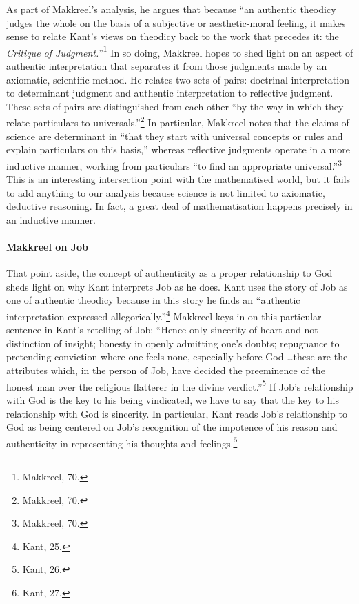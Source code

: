 \documentclass[12pt]{article}
\begin{document}
	As part of Makkreel's analysis, he argues that because ``an authentic theodicy judges the whole on the basis of a subjective or aesthetic-moral feeling, it makes sense to relate Kant's views on theodicy back to the work that precedes it: the \emph{Critique of Judgment.}''\footnote{Makkreel, 70.} In so doing, Makkreel hopes to shed light on an aspect of authentic interpretation that separates it from those judgments made by an axiomatic, scientific method. He relates two sets of pairs: doctrinal interpretation to determinant judgment and authentic interpretation to reflective judgment. These sets of pairs are distinguished from each other ``by the way in which they relate particulars to universals.''\footnote{Makkreel, 70.} In particular, Makkreel notes that the claims of science are determinant in ``that they start with universal concepts or rules and explain particulars on this basis,'' whereas reflective judgments operate in a more inductive manner, working from particulars ``to find an appropriate universal.''\footnote{Makkreel, 70.} This is an interesting intersection point with the mathematised world, but it fails to add anything to our analysis because science is not limited to axiomatic, deductive reasoning. In fact, a great deal of mathematisation happens precisely in an inductive manner. 
	
	\paragraph*{Makkreel on Job} That point aside, the concept of authenticity as a proper relationship to God sheds light on why Kant interprets Job as he does. Kant uses the story of Job as one of authentic theodicy because in this story he finds an ``authentic interpretation expressed allegorically.''\footnote{Kant, 25.} Makkreel keys in on this particular sentence in Kant's retelling of Job: ``Hence only sincerity of heart and not distinction of insight; honesty in openly admitting one's doubts; repugnance to pretending conviction where one feels none, especially before God \ldots these are the attributes which, in the person of Job, have decided the preeminence of the honest man over the religious flatterer in the divine verdict.''\footnote{Kant, 26.} If Job's relationship with God is the key to his being vindicated, we have to say that the key to his relationship with God is sincerity. In particular, Kant reads Job's relationship to God as being centered on Job's recognition of the impotence of his reason and authenticity in representing his thoughts and feelings.\footnote{Kant, 27.}
	
\end{document}
